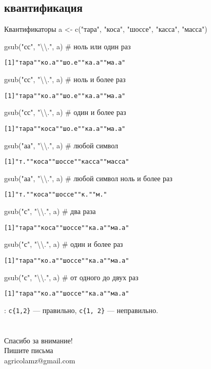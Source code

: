 \subsection{квантификация}
\begin{frame}[fragile]{Квантификаторы}
a <- c("тара"{}, "коса"{}, "шоссе"{}, "касса"{}, "масса")
\begin{itemize}
\mytem gsub("сс{\color{red!13!blue}{?}}"{}, "\textbackslash\textbackslash."{}, a) \hfill \# ноль или один раз
\scriptsize
\begin{alltt}
[1] "тара" "ко.а" "шо.е" "ка.а" "ма.а"
\end{alltt}
\normalsize
\mytem gsub("сс{\color{red!13!blue}{*}}"{}, "\textbackslash\textbackslash."{}, a) \hfill \# ноль и более раз
\scriptsize
\begin{alltt}
[1] "тара" "ко.а" "шо.е" "ка.а" "ма.а"
\end{alltt}
\normalsize
\mytem gsub("сс{\color{red!13!blue}{+}}"{}, "\textbackslash\textbackslash."{}, a) \hfill \# один и более раз
\scriptsize
\begin{alltt}
[1] "тара" "коса" "шо.е" "ка.а" "ма.а"
\end{alltt}
\normalsize
\mytem gsub("а{\color{red!13!blue}{.}}а"{}, "\textbackslash\textbackslash."{}, a) \hfill \# любой символ
\scriptsize
\begin{alltt}
[1] "т."    "коса"  "шоссе" "касса" "масса"
\end{alltt}
\normalsize
\mytem gsub("а{\color{red!13!blue}{.*}}а"{}, "\textbackslash\textbackslash."{}, a) \hfill \# любой символ ноль и более раз
\scriptsize
\begin{alltt}
[1] "т."    "коса"  "шоссе" "к." "м."
\end{alltt}
\normalsize
\mytem gsub("с{}"{}, "\textbackslash\textbackslash."{}, a) \hfill \# два раза
\scriptsize
\begin{alltt}
[1] "тара"    "коса"  "шоссе" "ка.а" "ма.а"
\end{alltt}
\normalsize
\mytem gsub("с{}"{}, "\textbackslash\textbackslash."{}, a) \hfill \# один и более раз
\scriptsize
\begin{alltt}
[1] "тара"    "ко.а"  "шоссе" "ка.а" "ма.а"
\end{alltt}
\normalsize
\mytem gsub("с{}"{}, "\textbackslash\textbackslash."{}, a) \hfill \# от одного до двух раз
\scriptsize
\begin{alltt}
[1] "тара"    "ко.а"  "шоссе" "ка.а" "ма.а"
\end{alltt}
\normalsize
\end{itemize}
\vspace{-2mm}
{\color{red!13!blue}{Пробел}}: \scriptsize\verb*"с{1,2}"\normalsize{} — правильно, \scriptsize\verb*"с{1, 2}"\normalsize{} — неправильно.
\end{frame}
\section{}
\begin{frame}
{\huge Спасибо за внимание!\bigskip\\
\normalsize Пишите письма\\
agricolamz@gmail.com
\vspace{-130pt}}
\end{frame}
